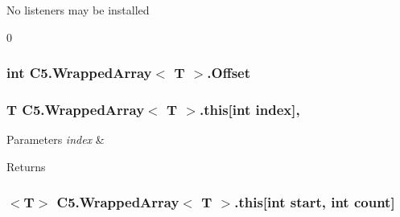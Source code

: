 No listeners may be installed 

0\hypertarget{class_c5_1_1_wrapped_array_a0c4465bdc31669ec9b73a23118a10195}{}
\subsubsection[{Offset}]{\setlength{\rightskip}{0pt plus 5cm}int {\bf C5.\+Wrapped\+Array}$<$ T $>$.Offset\hspace{0.3cm}{\ttfamily [get]}}\label{class_c5_1_1_wrapped_array_a0c4465bdc31669ec9b73a23118a10195}




\hypertarget{class_c5_1_1_wrapped_array_a3a76c7661d9e1b1612cdbcf2686c02c4}{}
\subsubsection[{this[int index]}]{\setlength{\rightskip}{0pt plus 5cm}T {\bf C5.\+Wrapped\+Array}$<$ T $>$.this\mbox{[}int index\mbox{]}\hspace{0.3cm}{\ttfamily [get]}, {\ttfamily [set]}}\label{class_c5_1_1_wrapped_array_a3a76c7661d9e1b1612cdbcf2686c02c4}





\begin{DoxyParams}{Parameters}
{\em index} & \\
\hline
\end{DoxyParams}
\begin{DoxyReturn}{Returns}

\end{DoxyReturn}
\hypertarget{class_c5_1_1_wrapped_array_a791feb63e897935f737406895d0a4f98}{}
\subsubsection[{this[int start, int count]}]{$<$T$>$ {\bf C5.\+Wrapped\+Array}$<$ T $>$.this\mbox{[}int start, int count\mbox{]}\hspace{0.3cm}{\ttfamily [get]}}\label{class_c5_1_1_wrapped_array_a791feb63e897935f737406895d0a4f98}





